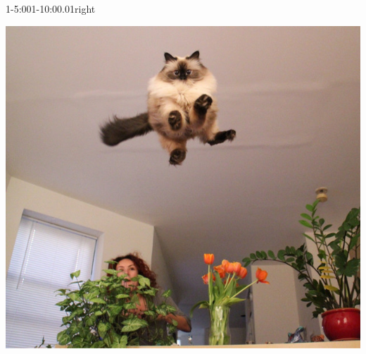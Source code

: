 \begin{vsvframe}{1-5:00}{1-10:00.01}{right}
\begin{enumerate}
\includegraphics[scale=0.2]{img/0003.jpg}
\end{enumerate}
\end{vsvframe}

